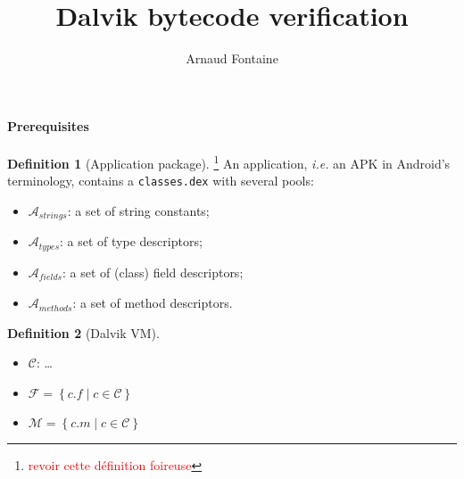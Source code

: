 \documentclass[english,dvips,ps2pdf,11pt]{article}
\title{Dalvik bytecode verification}
\author{Arnaud Fontaine}
\theoremstyle{definition}
\newtheorem{definition}{Definition}[section]
\newcommand{\todo}[1]{\footnote{\textcolor{red}{#1}}}
\newcommand{\var}[1]{\ensuremath{\mathit{#1}}\xspace}
\newcommand{\classes}[0]{\ensuremath{\mathcal{C}}\xspace}
\newcommand{\fields}[0]{\ensuremath{\mathcal{F}}\xspace}
\newcommand{\methods}[0]{\ensuremath{\mathcal{M}}\xspace}
\newcommand{\pfields}[0]{\ensuremath{\mathcal{A}_\var{fields}}\xspace}
\newcommand{\pstrings}[0]{\ensuremath{\mathcal{A}_\var{strings}}\xspace}
\newcommand{\ptypes}[0]{\ensuremath{\mathcal{A}_\var{types}}\xspace}
\newcommand{\pmethods}[0]{\ensuremath{\mathcal{A}_\var{methods}}\xspace}
\newcommand{\aclass}[1]{\texttt{#1}\xspace}
\newcommand{\jobject}[0]{\ensuremath{\texttt{java.lang.Object}}\xspace}
\newcommand{\jclass}[0]{\ensuremath{\texttt{java.lang.Class}}\xspace}
\newcommand{\jstring}[0]{\ensuremath{\texttt{java.lang.String}}\xspace}
\newcommand{\jexception}[0]{\ensuremath{\texttt{java.lang.Exception}}\xspace}
\newcommand{\ie}[0]{\textit{i.e.}\xspace}
\begin{document}
\maketitle

\paragraph{Prerequisites}

\begin{definition}[Application package]
  \todo{revoir cette définition foireuse}
  An application, \ie an APK in Android's terminology,
  contains a \texttt{classes.dex} with several pools:
  \begin{itemize}
  \item \pstrings : a set of string constants;
  \item \ptypes : a set of type descriptors;
  \item \pfields : a set of (class) field descriptors;
  \item \pmethods : a set of method descriptors.
  \end{itemize}
\end{definition}

\begin{definition}[Dalvik VM]
  \begin{itemize}
  \item \classes : \dots %
  \item $\fields = \left\{ c.f \mid c \in \classes \right\} $
  \item $\methods = \left\{ c.m \mid c \in \classes \right\} $
  \end{itemize}
\end{definition}
\end{document}
